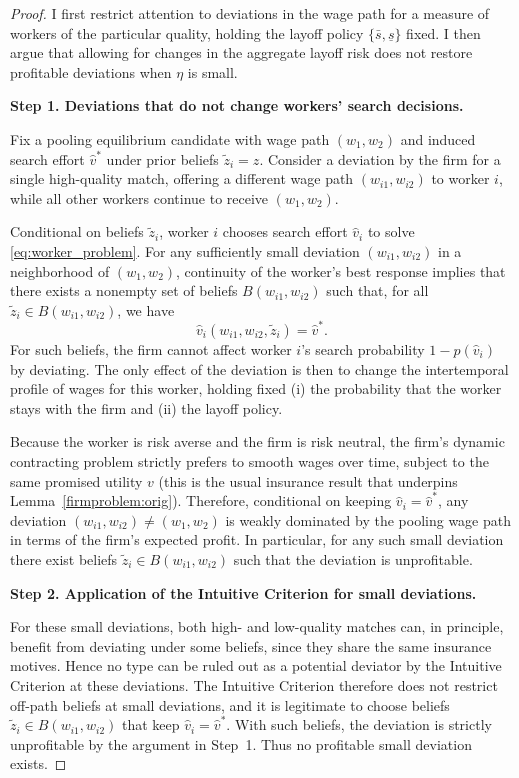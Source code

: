 \begin{proof}
I first restrict attention to deviations in the wage path for a measure of workers of the particular quality, holding the layoff policy $\{\bar{s},\underline{s}\}$ fixed. I then argue that allowing for changes in the aggregate layoff risk does not restore profitable deviations when $\eta$ is small.

\medskip
\noindent\textbf{Step 1. Deviations that do not change workers' search decisions.}

Fix a pooling equilibrium candidate with wage path $(w_1,w_2)$ and induced search effort $\hat{v}^\ast$ under prior beliefs $\tilde{z}_i = z$. Consider a deviation by the firm for a single high-quality match, offering a different wage path $(w_{i1},w_{i2})$ to worker $i$, while all other workers continue to receive $(w_1,w_2)$.

Conditional on beliefs $\tilde{z}_i$, worker $i$ chooses search effort $\hat{v}_i$ to solve \eqref{eq:worker_problem}. For any sufficiently small deviation $(w_{i1},w_{i2})$ in a neighborhood of $(w_1,w_2)$, continuity of the worker's best response implies that there exists a nonempty set of beliefs $B(w_{i1},w_{i2})$ such that, for all $\tilde{z}_i \in B(w_{i1},w_{i2})$, we have
\[
\hat{v}_i(w_{i1},w_{i2},\tilde{z}_i) = \hat{v}^\ast.
\]
For such beliefs, the firm cannot affect worker $i$'s search probability $1-p(\hat{v}_i)$ by deviating. The only effect of the deviation is then to change the intertemporal profile of wages for this worker, holding fixed (i) the probability that the worker stays with the firm and (ii) the layoff policy.

Because the worker is risk averse and the firm is risk neutral, the firm’s dynamic contracting problem strictly prefers to smooth wages over time, subject to the same promised utility $v$ (this is the usual insurance result that underpins Lemma~\ref{firmproblem:orig}). Therefore, conditional on keeping $\hat{v}_i = \hat{v}^\ast$, any deviation $(w_{i1},w_{i2}) \neq (w_1,w_2)$ is weakly dominated by the pooling wage path in terms of the firm’s expected profit. In particular, for any such small deviation there exist beliefs $ \tilde{z}_i \in B(w_{i1},w_{i2})$ such that the deviation is unprofitable.

\medskip
\noindent\textbf{Step 2. Application of the Intuitive Criterion for small deviations.}

For these small deviations, both high- and low-quality matches can, in principle, benefit from deviating under some beliefs, since they share the same insurance motives. Hence no type can be ruled out as a potential deviator by the Intuitive Criterion at these deviations. The Intuitive Criterion therefore does not restrict off-path beliefs at small deviations, and it is legitimate to choose beliefs $\tilde{z}_i \in B(w_{i1},w_{i2})$ that keep $\hat{v}_i = \hat{v}^\ast$. With such beliefs, the deviation is strictly unprofitable by the argument in Step~1. Thus no profitable small deviation exists.


\end{proof}
